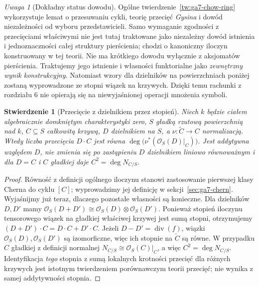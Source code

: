 \documentclass[11pt,a4paper,openany]{report}
\numberwithin{equation}{section}
\theoremstyle{plain}
\newtheorem{stwierdzenie}[twierdzenie]{Stwierdzenie}
\theoremstyle{definition}
\theoremstyle{remark}
\newtheorem{uwaga}[twierdzenie]{Uwaga}
\begin{document}
\begin{uwaga}[Dokładny status dowodu]
\label{uw:ga7-moving-lemma}
Ogólne twierdzenie~\ref{tw:ga7-chow-ring} wykorzystuje
lemat o przesuwaniu cykli, teorię przecięć \emph{Gysina}
i dowód niezależności od wyboru przedstawicieli.
Samo wymaganie zgodności z przecięciami właściwymi nie jest
tutaj traktowane jako niezależny dowód istnienia i jednoznaczności
całej struktury pierścienia; chodzi o kanoniczny iloczyn
konstruowany w tej teorii.
Nie ma krótkiego dowodu wyłącznie z aksjomatów pierścienia.
Traktujemy jego istnienie i własności funktorialne jako
\emph{zewnętrzny wynik konstrukcyjny}. Natomiast wzory dla
dzielników na powierzchniach poniżej zostaną wyprowadzone
ze stopni wiązek na krzywych. Dzięki temu
rachunki z rozdziału 6 nie opierają się na niewyjaśnionej
operacji mnożenia symboli.
\end{uwaga}

\begin{stwierdzenie}[Przecięcie z dzielnikiem przez stopień]
\label{st:ga7-divisor-degree}
Niech $k$ będzie ciałem algebraicznie domkniętym
charakterystyki zero, $S$ gładką rzutową powierzchnią
nad $k$, $C\subseteq S$ całkowitą krzywą,
$D$ dzielnikiem na $S$, a $\nu:\widetilde C\to C$
normalizacją. Wtedy liczba przecięcia $D\cdot C$ jest równa
$\deg\bigl(\nu^*(\mathcal O_S(D)|_C)\bigr)$.
Jest addytywna względem $D$, nie zmienia się po
zastąpieniu $D$ dzielnikiem liniowo równoważnym i
dla $D=C$ i $C$ gładkiej daje $C^2=\deg N_{C/S}$.
\end{stwierdzenie}
\begin{proof}
Równość z definicji ogólnego iloczynu stanowi
zastosowanie pierwszej klasy Cherna do cyklu $[C]$;
wyprowadzimy jej definicję w sekcji~\ref{sec:ga7-chern}.
Wyjaśnijmy już teraz, dlaczego pozostałe własności są
konieczne. Dla dzielników $D,D'$ mamy
$\mathcal O_S(D+D')\cong\mathcal O_S(D)\otimes\mathcal O_S(D')$.
Ponieważ stopień iloczynu tensorowego wiązek na gładkiej
właściwej krzywej jest sumą stopni, otrzymujemy
$(D+D')\cdot C=D\cdot C+D'\cdot C$.
Jeżeli $D-D'=\operatorname{div}(f)$, wiązki
$\mathcal O_S(D),\mathcal O_S(D')$ są izomorficzne,
więc ich stopnie na $\widetilde C$ są równe.
W przypadku $C$ gładkiej z definicji normalnej
$N_{C/S}\cong\mathcal O_S(C)|_C$,
a więc $C^2=\deg N_{C/S}$.
Identyfikacja \emph{tego} stopnia z sumą lokalnych
krotności przecięć dla różnych krzywych jest
istotnym twierdzeniem porównawczym teorii przecięć;
nie wynika z samej addytywności stopnia.
\end{proof}
\end{document}
